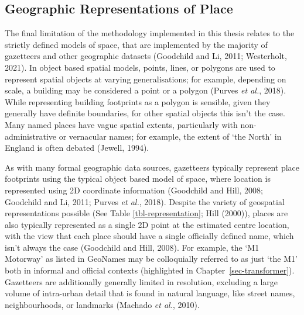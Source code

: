 \documentclass[
  letterpaper,
  11pt,
  english,
  onehalfspacing,
  headsepline]{MastersDoctoralThesis}
\begin{document}
\hypertarget{geographic-representations-of-place}{%
\subsection{Geographic Representations of
Place}\label{geographic-representations-of-place}}

The final limitation of the methodology implemented in this thesis
relates to the strictly defined models of space, that are implemented by
the majority of gazetteers and other geographic datasets (Goodchild and
Li, 2011; Westerholt, 2021). In object based spatial models, points,
lines, or polygons are used to represent spatial objects at varying
generalisations; for example, depending on scale, a building may be
considered a point or a polygon (Purves \emph{et al.}, 2018). While
representing building footprints as a polygon is sensible, given they
generally have definite boundaries, for other spatial objects this isn't
the case. Many named places have vague spatial extents, particularly
with non-administrative or vernacular names; for example, the extent of
`the North' in England is often debated (Jewell, 1994).

As with many formal geographic data sources, gazetteers typically
represent place footprints using the typical object based model of
space, where location is represented using 2D coordinate information
(Goodchild and Hill, 2008; Goodchild and Li, 2011; Purves \emph{et al.},
2018). Despite the variety of geospatial representations possible (See
Table \ref{tbl-representation}; Hill (2000)), places are also typically
represented as a single 2D point at the estimated centre location, with
the view that each place should have a single officially defined name,
which isn't always the case (Goodchild and Hill, 2008). For example, the
`M1 Motorway' as listed in GeoNames may be colloquially referred to as
just `the M1' both in informal and official contexts (highlighted in
Chapter~\ref{sec-transformer}). Gazetteers are additionally generally
limited in resolution, excluding a large volume of intra-urban detail
that is found in natural language, like street names, neighbourhoods, or
landmarks (Machado \emph{et al.}, 2010).
\end{document}
